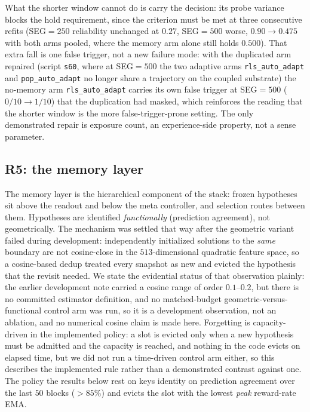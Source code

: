 \documentclass[preprint,12pt]{elsarticle}
\begin{document}
What the shorter window cannot do is carry
the decision: its probe variance blocks the hold requirement, since the
criterion must be met at three consecutive refits (SEG$=250$ reliability
unchanged at $0.27$, SEG$=500$ worse, $0.90\to0.475$ with both arms pooled,
where the memory arm alone still holds $0.500$). That extra fall is one false
trigger, not a new failure mode: with the duplicated arm repaired (script
\texttt{s60}, where at SEG$=500$ the two adaptive arms \texttt{rls\_auto\_adapt} and \texttt{pop\_auto\_adapt} no longer share a trajectory on the coupled substrate) the
no-memory arm \texttt{rls\_auto\_adapt} carries its own false trigger at
SEG$=500$ ($0/10\to1/10$) that the duplication had masked, which reinforces
the reading that the shorter window is the more false-trigger-prone setting.
The only
demonstrated repair is exposure count, an experience-side property, not
a sense parameter.

\subsection{R5: the memory layer}
\label{sec:r5}

The memory layer is the hierarchical component of the stack: frozen
hypotheses sit above the readout and below the meta controller, and
selection routes between them. Hypotheses are identified \emph{functionally} (prediction agreement), not
geometrically. The mechanism was settled that way after the geometric variant
failed during development: independently initialized solutions to the
\emph{same} boundary are not cosine-close in the $513$-dimensional quadratic
feature space, so a cosine-based dedup treated every snapshot as new and
evicted the hypothesis that the revisit needed. We state the evidential status
of that observation plainly: the earlier development note carried a
cosine range of order $0.1$--$0.2$, but there is no committed estimator
definition, and no matched-budget geometric-versus-functional control arm was
run, so it is a development observation, not an ablation, and no numerical
cosine claim is made here. Forgetting is capacity-driven in the
implemented policy: a slot is evicted only when a new hypothesis must be
admitted and the capacity is reached, and nothing in the code evicts on
elapsed time, but we did not run a time-driven control arm either, so this
describes the implemented rule rather than a demonstrated contrast against
one. The policy the results below rest on keys identity on prediction
agreement over the last $50$ blocks ($>85\%$) and evicts the slot with the
lowest \emph{peak} reward-rate EMA.
\end{document}
